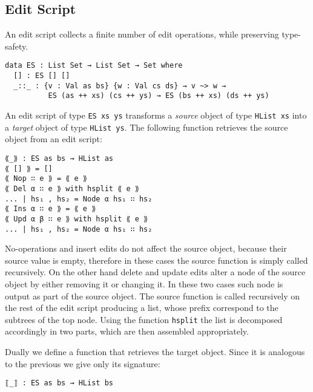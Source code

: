 \documentclass[preprint]{sigplanconf}
\begin{document}
	\subsection{Edit Script}
	An edit script collects a finite number of edit operations, 
	while preserving type-safety. 
\begin{verbatim}
data ES : List Set → List Set → Set where
  [] : ES [] []
  _::_ : {v : Val as bs} {w : Val cs ds} → v ~> w → 
          ES (as ++ xs) (cs ++ ys) → ES (bs ++ xs) (ds ++ ys)
\end{verbatim}	
	An edit script of type \texttt{ES xs ys} transforms
	a \emph{source} object of type \texttt{HList xs} into
	a \emph{target} object of type \texttt{HList ys}. 
	The following function retrieves the source object from an edit script:			
\begin{verbatim}
⟪_⟫ : ES as bs → HList as
⟪ [] ⟫ = []
⟪ Nop ∷ e ⟫ = ⟪ e ⟫
⟪ Del α ∷ e ⟫ with hsplit ⟪ e ⟫
... | hs₁ , hs₂ = Node α hs₁ ∷ hs₂
⟪ Ins α ∷ e ⟫ = ⟪ e ⟫
⟪ Upd α β ∷ e ⟫ with hsplit ⟪ e ⟫
... | hs₁ , hs₂ = Node α hs₁ ∷ hs₂
\end{verbatim}
	No-operations and insert edits do not affect the source object,
	because their source value is empty, therefore in these cases the source 
	function is simply called recursively.
	On the other hand delete and update edits alter a node of the
	source object by either removing it or changing it.
	In these two cases such node is output as part of the source object.
	The source function is called recursively on the rest of the edit 
	script producing a list, whose prefix correspond to the subtrees of the
	top node. Using the function \texttt{hsplit} the list is decomposed 
	accordingly in two parts, which are then assembled appropriately.
	
	Dually we define a function that retrieves the target object.
	Since it is analogous to the previous we give only its signature:
	
\begin{verbatim}
⟦_⟧ : ES as bs → HList bs
\end{verbatim}
\end{document}
